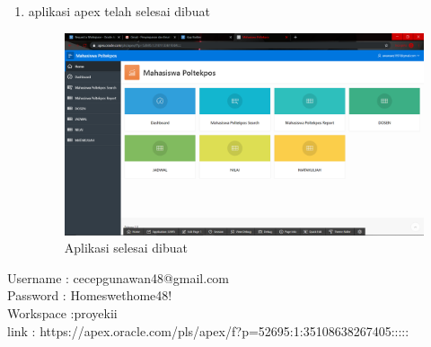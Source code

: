 \begin{enumerate}
\item aplikasi apex telah selesai dibuat
\begin{figure}[H]
    \centering
    \includegraphics[scale=0.2]{figures/28}
    \caption{ Aplikasi selesai dibuat}
    \label{Indentasi}
\end{figure}
\end{enumerate}

\par 
Username : cecepgunawan48@gmail.com \\
Password : Homeswethome48! \\
Workspace :proyekii \\
link     : https://apex.oracle.com/pls/apex/f?p=52695:1:35108638267405:::::
